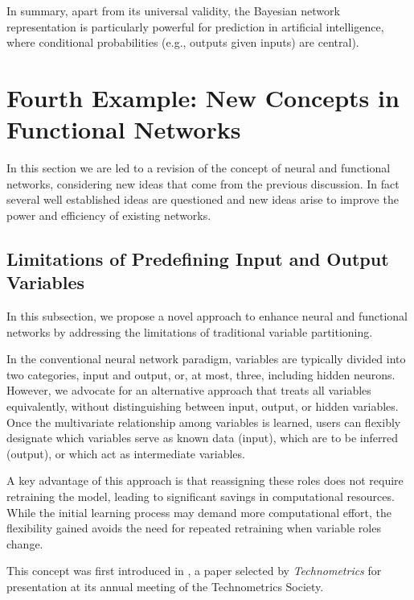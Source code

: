 \documentclass[
	11pt, %
	fleqn, %
	a4paper, %
]{LegrandOrangeBook}
\begin{document}
In summary, apart from its universal validity, the Bayesian network representation is particularly powerful for prediction in artificial intelligence, where conditional probabilities (e.g., outputs given inputs) are central).

%

%

\chapter{Fourth Example: New Concepts in Functional Networks}
\label{ch:newfunctionalnetworks}

In this section we are led to a revision of the concept of neural and functional networks, considering new ideas that come from the previous discussion. In fact several well established ideas are questioned and new ideas arise to improve the power and efficiency of existing networks.

\section{Limitations of Predefining Input and Output Variables}
In this subsection, we propose a novel approach to enhance neural and functional networks by addressing the limitations of traditional variable partitioning.

In the conventional neural network paradigm, variables are typically divided into two categories, input and output, or, at most, three, including hidden neurons. However, we advocate for an alternative approach that treats all variables equivalently, without distinguishing between input, output, or hidden variables. Once the multivariate relationship among variables is learned, users can flexibly designate which variables serve as known data (input), which are to be inferred (output), or which act as intermediate variables.

A key advantage of this approach is that reassigning these roles does not require retraining the model, leading to significant savings in computational resources. While the initial learning process may demand more computational effort, the flexibility gained avoids the need for repeated retraining when variable roles change.

This concept was first introduced in \cite{CastilloGHL:01a}, a paper selected by \emph{Technometrics} for presentation at its annual meeting of the Technometrics Society.
\end{document}
